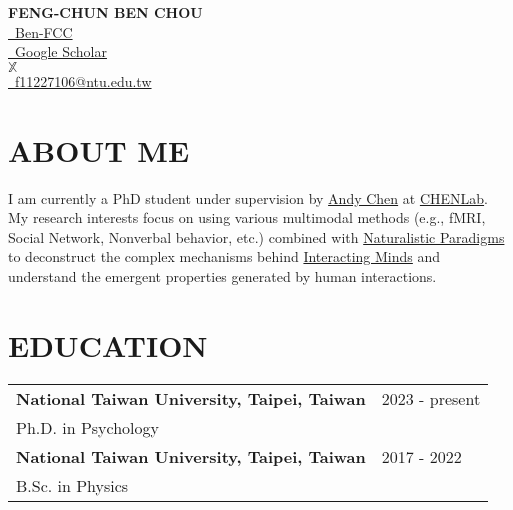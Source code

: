 \documentclass[a4paper,12pt]{article}
\newcommand{\sectionspace}{0pt} %
\begin{document}
\sloppy %

\begin{center}
    \textbf{{\fontsize{25}{48}\selectfont F}{\fontsize{18}{48}\selectfont ENG-}{\fontsize{25}{48}\selectfont C}{\fontsize{18}{48}\selectfont HUN }{\fontsize{25}{48}\selectfont B}{\fontsize{18}{48}\selectfont EN} {\fontsize{25}{48}\selectfont C}{\fontsize{18}{48}\selectfont HOU}} \\
    \vspace{10pt}
    \href{https://github.com/Ben-FCC}{\color{black}\faGithub \ Ben-FCC} \\
    \href{https://scholar.google.com/citations?user=oZ5rsb0AAAAJ&hl=en}{\color{black}\faGoogle \ Google Scholar}\\
    \href{https://x.com/FengChunChou}{$\mathbb{X}$ \@FengChunChou}\\
    \href{mailto:f11227106@ntu.edu.tw}{\color{black}\faEnvelope \ f11227106@ntu.edu.tw} \\
    
\end{center}

\vspace{10pt}

\section*{ABOUT ME}
I am currently a PhD student under supervision by \href{https://scholar.google.com/citations?hl=en&user=wXNCX4EAAAAJ&view_op=list_works&sortby=pubdate}{Andy Chen} at \href{https://www.chenlaboratory.com/}{CHENLab}. My research interests focus on using various multimodal methods (e.g., fMRI, Social Network, Nonverbal behavior, etc.) combined with \href{https://naturalistic-data.org/content/intro.html}{Naturalistic Paradigms} to deconstruct the complex mechanisms behind \href{https://cosanlab.com/static/papers/Wheatley_2023_PISP.pdf}{Interacting Minds} and understand the emergent properties generated by human interactions.
\vspace{\sectionspace}

\section*{EDUCATION}

\begin{flushright}
\begin{tabular}{@{}p{}@{}p{}@{}}
    \textbf{National Taiwan University, Taipei, Taiwan} & \hfill 2023 - present \\
    Ph.D. in Psychology & \\[6pt]
    \textbf{National Taiwan University, Taipei, Taiwan} & \hfill 2017 - 2022 \\
    B.Sc. in Physics & \\
\end{tabular}
\end{flushright}
\end{document}
